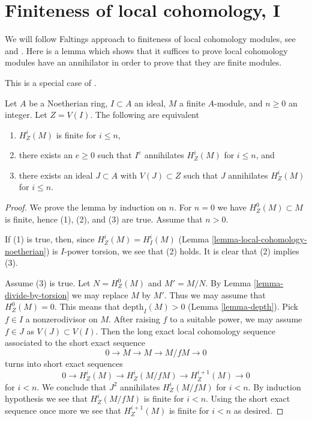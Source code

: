 \section{Finiteness of local cohomology, I}
\label{section-finiteness}

\noindent
We will follow Faltings approach to finiteness of local cohomology
modules, see \cite{Faltings-annulators} and \cite{Faltings-finiteness}.
Here is a lemma which shows that it suffices to prove
local cohomology modules have an annihilator in order to prove that
they are finite modules.

\begin{lemma}
\label{lemma-check-finiteness-local-cohomology-by-annihilator}
\begin{reference}
This is a special case of \cite[Lemma 3]{Faltings-annulators}.
\end{reference}
Let $A$ be a Noetherian ring, $I \subset A$ an ideal, $M$ a finite
$A$-module, and $n \geq 0$ an integer. Let $Z = V(I)$.
The following are equivalent
\begin{enumerate}
\item $H^i_Z(M)$ is finite for $i \leq n$,
\item there exists an $e \geq 0$ such that $I^e$ annihilates
$H^i_Z(M)$ for $i \leq n$, and
\item there exists an ideal $J \subset A$ with $V(J) \subset Z$
such that $J$ annihilates $H^i_Z(M)$ for $i \leq n$.
\end{enumerate}
\end{lemma}

\begin{proof}
We prove the lemma by induction on $n$. For $n = 0$ we have
$H^0_Z(M) \subset M$ is finite, hence (1), (2), and (3) are true.
Assume that $n > 0$.

\medskip\noindent
If (1) is true, then, since $H^i_Z(M) = H^i_I(M)$
(Lemma \ref{lemma-local-cohomology-noetherian})
is $I$-power torsion, we see that (2) holds.
It is clear that (2) implies (3).

\medskip\noindent
Assume (3) is true. Let $N = H^0_Z(M)$ and $M' = M/N$.
By Lemma \ref{lemma-divide-by-torsion} we may replace $M$ by $M'$.
Thus we may assume that $H^0_Z(M) = 0$.
This means that $\text{depth}_I(M) > 0$ (Lemma \ref{lemma-depth}).
Pick $f \in I$ a nonzerodivisor on $M$. After raising $f$ to a suitable
power, we may assume $f \in J$ as $V(J) \subset V(I)$. Then the
long exact local cohomology sequence associated to the short
exact sequence
$$
0 \to M \to M \to M/fM \to 0
$$
turns into short exact sequences
$$
0 \to H^i_Z(M) \to H^i_Z(M/fM) \to H^{i + 1}_Z(M) \to 0
$$
for $i < n$. We conclude that $J^2$ annihilates $H^i_Z(M/fM)$
for $i < n$. By induction hypothesis we see that $H^i_Z(M/fM)$
is finite for $i < n$. Using the short exact sequence once more
we see that $H^{i + 1}_Z(M)$ is finite for $i < n$ as desired.
\end{proof}


